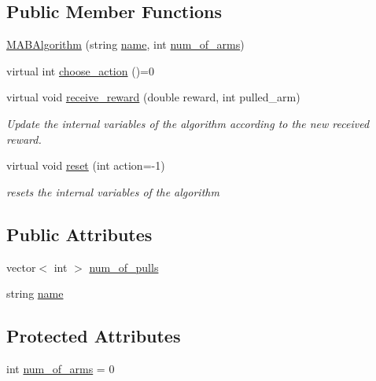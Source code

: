 \subsection*{Public Member Functions}
\begin{DoxyCompactItemize}
\item 
\mbox{\hyperlink{class_m_a_b_algorithm_a9a938041685a1912995d427027971de4}{M\+A\+B\+Algorithm}} (string \mbox{\hyperlink{class_m_a_b_algorithm_a77b10ecc4b49d519c557f65358167b82}{name}}, int \mbox{\hyperlink{class_m_a_b_algorithm_a340fa9e83e85b092f2c6125fc4e8549b}{num\+\_\+of\+\_\+arms}})
\item 
virtual int \mbox{\hyperlink{class_m_a_b_algorithm_afb48f01df0e1860d19759f6e20335007}{choose\+\_\+action}} ()=0
\item 
virtual void \mbox{\hyperlink{class_m_a_b_algorithm_aa584b3d6b86fa050e3389be9781b5782}{receive\+\_\+reward}} (double reward, int pulled\+\_\+arm)
\begin{DoxyCompactList}\small\item\em Update the internal variables of the algorithm according to the new received reward. \end{DoxyCompactList}\item 
virtual void \mbox{\hyperlink{class_m_a_b_algorithm_ad5761cee0b0e3421d1f043dbcc0b5f85}{reset}} (int action=-\/1)
\begin{DoxyCompactList}\small\item\em resets the internal variables of the algorithm \end{DoxyCompactList}\end{DoxyCompactItemize}
\subsection*{Public Attributes}
\begin{DoxyCompactItemize}
\item 
vector$<$ int $>$ \mbox{\hyperlink{class_m_a_b_algorithm_a46daff3833924ea5ebbda86113699fd3}{num\+\_\+of\+\_\+pulls}}
\item 
string \mbox{\hyperlink{class_m_a_b_algorithm_a77b10ecc4b49d519c557f65358167b82}{name}}
\end{DoxyCompactItemize}
\subsection*{Protected Attributes}
\begin{DoxyCompactItemize}
\item 
int \mbox{\hyperlink{class_m_a_b_algorithm_a340fa9e83e85b092f2c6125fc4e8549b}{num\+\_\+of\+\_\+arms}} = 0
\end{DoxyCompactItemize}


